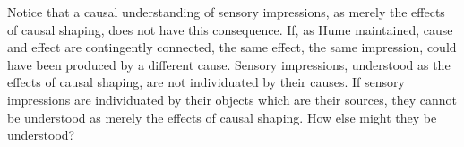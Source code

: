 
Notice that a causal understanding of sensory impressions, as merely the effects of causal shaping, does not have this consequence. If, as Hume maintained, cause and effect are contingently connected, the same effect, the same impression, could have been produced by a different cause. Sensory impressions, understood as the effects of causal shaping, are not individuated by their causes. If sensory impressions are individuated by their objects which are their sources, they cannot be understood as merely the effects of causal shaping. How else might they be understood?

